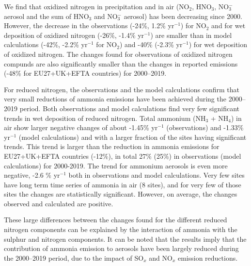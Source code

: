 We find that oxidized nitrogen in precipitation and in air (NO$_2$, HNO$_3$, NO$_3^{-}$ aerosol and the sum of HNO$_3$ and NO$_3^{-}$ aerosol) has been decreasing since 2000. However, the decrease in the observations (-24\%, 1.2\% yr$^{-1}$) for NO$_2$ and for wet deposition of oxidized nitrogen (-26\%, -1.4\% yr$^{-1}$) are smaller than in model calculations (-42\%, -2.2\% yr$^{-1}$ for NO$_2$) and -40\% (-2.3\% yr$^{-1}$) for wet deposition of oxidized nitrogen. The changes found for observations of oxidized nitrogen compunds are also significantly smaller than the changes in reported emissions (-48\% for EU27+UK+EFTA countries) for 2000--2019.

For reduced nitrogen, the observations and the model calculations confirm that very small reductions of ammonia emissions have been achieved during the 2000--2019 period. 
Both observations and model calculations find very few significant trends in wet deposition of reduced nitrogen.
Total ammonium (NH$_3$ + NH$_4$) in air show larger negative changes of about -1.45\% yr$^{-1}$ (observations) and -1.33\% yr$^{-1}$ (model calculations) and with a larger fraction of the sites having significant trends. This trend is larger than the reduction in ammonia emissions for EU27+UK+EFTA countries (-12\%), in total 27\% (25\%) in observations (model calculations) for 2000-2019. The trend for ammonium aerosols is even more negative, -2.6 \% yr$^{-1}$ both in observations and model calculations. Very few sites have long term time series of ammonia in air (8 sites), and for very few of those sites the changes are statistically significant. However, on average, the changes observed and calculated are positive. 

These large differences between the changes found for the different reduced nitrogen components can be explained by the interaction of ammonia with the sulphur and nitrogen components. It can be noted that the results imply that the contribution of ammonia emission to aerosols have been largely reduced during the 2000--2019 period, due to the impact of SO$_x$ and NO$_x$ emission reductions. 



